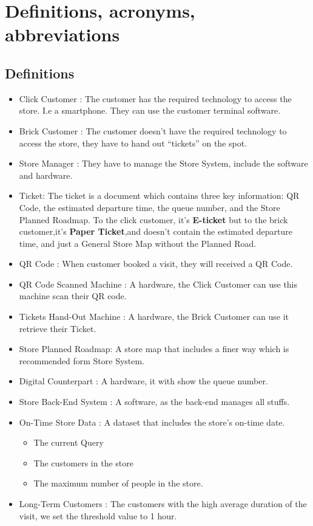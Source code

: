 \documentclass[a4paper,12pt]{book}
\begin{document}
\section{Definitions, acronyms, abbreviations}
\subsection{Definitions}\label{Definitions}
\begin{itemize}
	\item Click Customer : The customer has the required technology to access the store. I.e a smartphone. They can use the customer terminal software.
	\item Brick Customer : The customer doesn't have the required technology to access the store, they have to hand out “tickets” on the spot.
	\item Store Manager : They have to manage the Store System, include the software and hardware.
	\item Ticket: The ticket is a document which contains three key information: QR Code, the estimated departure time, the queue number, and the Store Planned Roadmap. To the click customer, it's \textbf{E-ticket} but to the brick customer,it's \textbf{Paper Ticket},and doesn't contain the estimated departure time, and just a General Store Map without the Planned Road.
	\item QR Code : When customer booked a visit, they will received a QR Code.
	\item QR Code Scanned Machine : A hardware, the Click Customer can use this machine scan their QR code.
	\item Tickets Hand-Out Machine : A hardware, the Brick Customer can use it retrieve their Ticket.
	\item Store Planned Roadmap: A store map that includes a finer way which is recommended form Store System.
	\item Digital Counterpart : A hardware, it with show the queue number.
	\item Store Back-End System : A software, as the back-end manages all stuffs.
	\item On-Time Store Data : A dataset that includes the store's on-time date.
	\begin{itemize}
	\item The current Query 
	\item The customers in the store
	\item The maximum number of people in the store.
	\end{itemize}
	\item Long-Term Customers : The customers with the high average duration of the visit, we set the threshold value to 1 hour.
\end{itemize}
\end{document}

